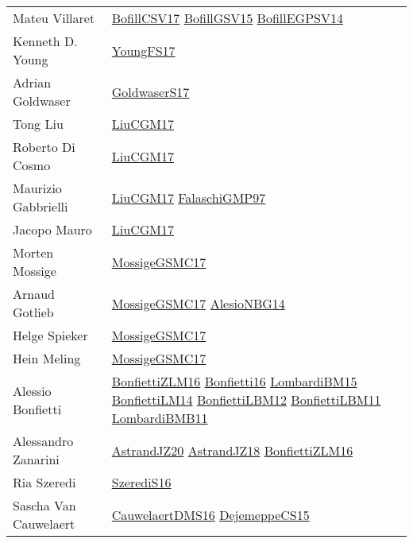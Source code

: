 {\begin{longtable}{p{4cm}p{15cm}}
Mateu Villaret & \href{papers/BofillCSV17.pdf}{BofillCSV17}\cite{BofillCSV17} \href{papers/BofillGSV15.pdf}{BofillGSV15}\cite{BofillGSV15} \href{papers/BofillEGPSV14.pdf}{BofillEGPSV14}\cite{BofillEGPSV14} \\
Kenneth D. Young & \href{papers/YoungFS17.pdf}{YoungFS17}\cite{YoungFS17} \\
Adrian Goldwaser & \href{papers/GoldwaserS17.pdf}{GoldwaserS17}\cite{GoldwaserS17} \\
Tong Liu & \href{papers/LiuCGM17.pdf}{LiuCGM17}\cite{LiuCGM17} \\
Roberto Di Cosmo & \href{papers/LiuCGM17.pdf}{LiuCGM17}\cite{LiuCGM17} \\
Maurizio Gabbrielli & \href{papers/LiuCGM17.pdf}{LiuCGM17}\cite{LiuCGM17} \href{articles/FalaschiGMP97.pdf}{FalaschiGMP97}\cite{FalaschiGMP97} \\
Jacopo Mauro & \href{papers/LiuCGM17.pdf}{LiuCGM17}\cite{LiuCGM17} \\
Morten Mossige & \href{papers/MossigeGSMC17.pdf}{MossigeGSMC17}\cite{MossigeGSMC17} \\
Arnaud Gotlieb & \href{papers/MossigeGSMC17.pdf}{MossigeGSMC17}\cite{MossigeGSMC17} \href{papers/AlesioNBG14.pdf}{AlesioNBG14}\cite{AlesioNBG14} \\
Helge Spieker & \href{papers/MossigeGSMC17.pdf}{MossigeGSMC17}\cite{MossigeGSMC17} \\
Hein Meling & \href{papers/MossigeGSMC17.pdf}{MossigeGSMC17}\cite{MossigeGSMC17} \\
Alessio Bonfietti & \href{papers/BonfiettiZLM16.pdf}{BonfiettiZLM16}\cite{BonfiettiZLM16} \href{articles/Bonfietti16.pdf}{Bonfietti16}\cite{Bonfietti16} \href{papers/LombardiBM15.pdf}{LombardiBM15}\cite{LombardiBM15} \href{papers/BonfiettiLM14.pdf}{BonfiettiLM14}\cite{BonfiettiLM14} \href{papers/BonfiettiLBM12.pdf}{BonfiettiLBM12}\cite{BonfiettiLBM12} \href{papers/BonfiettiLBM11.pdf}{BonfiettiLBM11}\cite{BonfiettiLBM11} \href{papers/LombardiBMB11.pdf}{LombardiBMB11}\cite{LombardiBMB11} \\
Alessandro Zanarini & \href{articles/AstrandJZ20.pdf}{AstrandJZ20}\cite{AstrandJZ20} \href{papers/AstrandJZ18.pdf}{AstrandJZ18}\cite{AstrandJZ18} \href{papers/BonfiettiZLM16.pdf}{BonfiettiZLM16}\cite{BonfiettiZLM16} \\
Ria Szeredi & \href{papers/SzerediS16.pdf}{SzerediS16}\cite{SzerediS16} \\
Sascha Van Cauwelaert & \href{papers/CauwelaertDMS16.pdf}{CauwelaertDMS16}\cite{CauwelaertDMS16} \href{papers/DejemeppeCS15.pdf}{DejemeppeCS15}\cite{DejemeppeCS15} \\

\end{longtable}}
